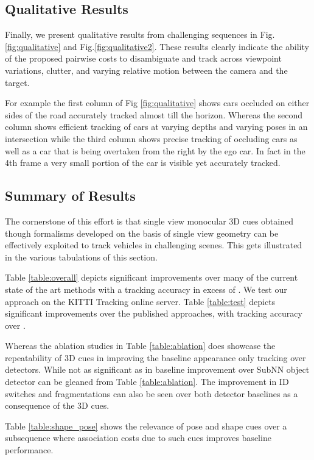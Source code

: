 \documentclass[letterpaper, 10 pt, conference]{ieeeconf}
\begin{document}
\subsection{Qualitative Results}

Finally, we present qualitative results from challenging sequences in Fig.\ref{fig:qualitative} and Fig.\ref{fig:qualitative2}. 
These results clearly indicate the ability of the proposed pairwise costs to disambiguate and track across viewpoint variations, clutter, and varying relative motion between the camera and the target.

For example the first column of Fig \ref{fig:qualitative} shows cars occluded on either sides of the road accurately tracked almost till the horizon. Whereas the second column shows efficient tracking of cars at varying depths and varying poses in an intersection while the third column shows precise tracking of occluding cars as well as a car that is being overtaken from the right by the ego car. In fact  in the 4th frame a very small portion of the car is visible yet accurately tracked.

\subsection{Summary of Results}

The cornerstone of this effort is that single view monocular 3D cues obtained though formalisms developed on the basis of single view geometry can be effectively exploited to track vehicles in challenging scenes. This gets illustrated in the various tabulations of this section. 

Table \ref{table:overall} depicts significant improvements over many of the current state of the art methods with a tracking accuracy in excess of . 
We test our approach on the KITTI Tracking online server. Table \ref{table:test} depicts significant improvements over the published approaches, with tracking accuracy over .

Whereas the ablation studies in Table \ref{table:ablation} does showcase the repeatability of 3D cues in improving the baseline appearance only tracking over detectors. While not as significant as in \cite{RRC} baseline improvement over SubNN object detector\cite{SubCNN} can be gleaned from Table \ref{table:ablation}. The improvement in ID switches and fragmentations can also be seen over both detector baselines as a consequence of the 3D cues. 

Table \ref{table:shape_pose} shows the relevance of pose and shape cues over a subsequence where association costs due to such cues improves baseline performance. 
\end{document}
